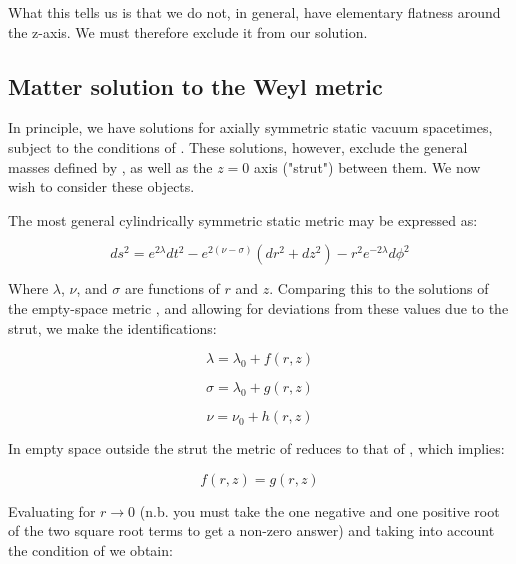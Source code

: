 \documentclass{article}
\begin{document}
What this tells us is that we do not, in general, have elementary flatness around the z-axis. We must therefore exclude it from our solution.

\subsection{Matter solution to the Weyl metric}

In principle, we have solutions for axially symmetric static vacuum spacetimes, subject to the conditions of . These solutions, however, exclude the general masses defined by , as well as the $z=0$ axis ("strut") between them. We now wish to consider these objects. 

The most general cylindrically symmetric static metric may be expressed as:

\begin{equation}
ds^{2}=e^{2\lambda}dt^{2}-e^{2\left(\nu-\sigma\right)}\left(dr^{2}+dz^{2}\right)-r^{2}e^{-2\lambda}d\phi^{2}
\label{eq:weyl-metric}
\end{equation}

Where $\lambda$, $\nu$, and $\sigma$ are functions of $r$ and $z$. Comparing this to the solutions of the empty-space metric , and allowing for deviations from these values due to the strut, we make the identifications:

\begin{equation}
	\label{eq:lambda-matter}
	\lambda=\lambda_0 + f(r,z)
\end{equation}

\begin{equation}
	\label{eq:sigma-matter}
	\sigma=\lambda_0 + g(r,z)
\end{equation}

\begin{equation}
	\label{eq:nu-matter}
	\nu=\nu_0 + h(r,z)
\end{equation}

In empty space outside the strut the metric of  reduces to that of  , which implies:

\begin{equation}
	\label{eq:f=g}
	f(r,z)=g(r,z)
\end{equation}

Evaluating  for $r\rightarrow 0$ (n.b. you must take the one negative and one positive root of the two square root terms to get a non-zero answer) and taking into account the condition of  we obtain:
\end{document}
